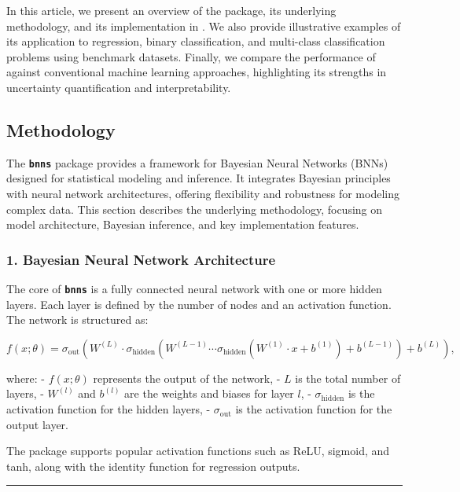 \documentclass[
]{jss}
\begin{document}
In this article, we present an overview of the  package, its
underlying methodology, and its implementation in . We also
provide illustrative examples of its application to regression, binary
classification, and multi-class classification problems using benchmark
datasets. Finally, we compare the performance of  against
conventional machine learning approaches, highlighting its strengths in
uncertainty quantification and interpretability.

\subsection{Methodology}\label{methodology}

The \textbf{\texttt{bnns}} package provides a framework for Bayesian
Neural Networks (BNNs) designed for statistical modeling and inference.
It integrates Bayesian principles with neural network architectures,
offering flexibility and robustness for modeling complex data. This
section describes the underlying methodology, focusing on model
architecture, Bayesian inference, and key implementation features.

\subsubsection{1. Bayesian Neural Network
Architecture}\label{bayesian-neural-network-architecture}

The core of \textbf{\texttt{bnns}} is a fully connected neural network
with one or more hidden layers. Each layer is defined by the number of
nodes and an activation function. The network is structured as:

\[
f(x; \theta) = \sigma_{\text{out}} \left( W^{(L)} \cdot \sigma_{\text{hidden}} \left( W^{(L-1)} \cdots \sigma_{\text{hidden}} \left(W^{(1)} \cdot x + b^{(1)}\right) + b^{(L-1)}\right) + b^{(L)}\right),
\]

where: - \(f(x; \theta)\) represents the output of the network, - \(L\)
is the total number of layers, - \(W^{(l)}\) and \(b^{(l)}\) are the
weights and biases for layer \(l\), - \(\sigma_{\text{hidden}}\) is the
activation function for the hidden layers, - \(\sigma_{\text{out}}\) is
the activation function for the output layer.

The package supports popular activation functions such as ReLU, sigmoid,
and tanh, along with the identity function for regression outputs.

\begin{center}\rule{0.5\linewidth}{0.5pt}\end{center}
\end{document}
